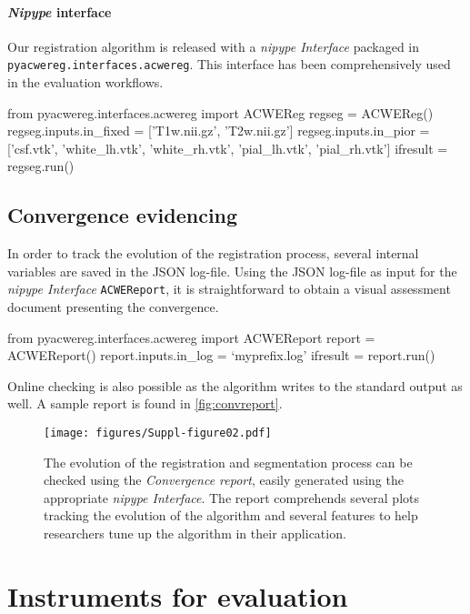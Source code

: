 \documentclass[a4paper]{report}
\newcommand*{\codeinline}[1]{\colorbox{listingbg}{\lstinline!#1!}}
\begin{document}
\paragraph{\emph{Nipype} interface}
Our registration algorithm is released with a \emph{nipype Interface} packaged in
  \codeinline{pyacwereg.interfaces.acwereg}.
This interface has been comprehensively used in the evaluation workflows.

\begin{pythoncode}
from pyacwereg.interfaces.acwereg import ACWEReg
regseg = ACWEReg()
regseg.inputs.in_fixed = ['T1w.nii.gz', 'T2w.nii.gz']
regseg.inputs.in_pior = ['csf.vtk', 'white_lh.vtk', 'white_rh.vtk',
                         'pial_lh.vtk', 'pial_rh.vtk']
ifresult = regseg.run()
\end{pythoncode}


\subsection{Convergence evidencing}\label{sec:convergence_evidence}

In order to track the evolution of the registration process, several internal variables
  are saved in the JSON log-file.
Using the JSON log-file as input for the \emph{nipype Interface}
  \codeinline{ACWEReport}, it is straightforward to obtain
  a visual assessment document presenting the convergence.
\begin{pythoncode}
from pyacwereg.interfaces.acwereg import ACWEReport
report = ACWEReport()
report.inputs.in_log = `myprefix.log'
ifresult = report.run()
\end{pythoncode}

Online checking is also possible as the algorithm writes to the standard output as well.
A sample report is found in \autoref{fig:convreport}.

\begin{figure*}[b]
  \texttt{[image: figures/Suppl-figure02.pdf]}
  \caption{The evolution of the registration and segmentation process can be
    checked using the \emph{Convergence report},
    easily generated using the appropriate \emph{nipype Interface}.
  The report comprehends several plots tracking the evolution of the algorithm and several
    features to help researchers tune up the algorithm in their application.}%
    \label{fig:convreport}
\end{figure*}

\section{Instruments for evaluation}
\end{document}
